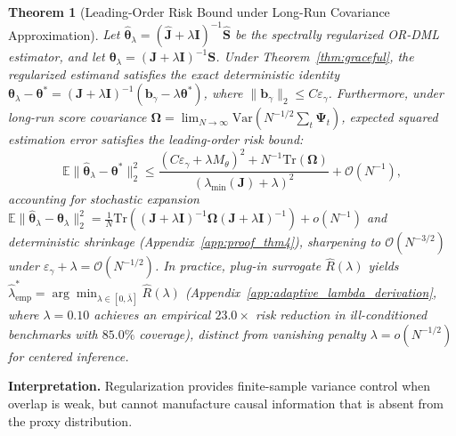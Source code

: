 \documentclass[twoside]{article}
\newtheorem{theorem}{Theorem}
\theoremstyle{definition}
\newcommand{\E}{\mathbb{E}}
\newcommand{\Var}{\mathrm{Var}}
\begin{document}
\begin{theorem}[Leading-Order Risk Bound under Long-Run Covariance Approximation]
\label{thm:spectral}
Let $\hat{\boldsymbol{\theta}}_\lambda = (\hat{\boldsymbol{J}} + \lambda \boldsymbol{I})^{-1}\hat{\boldsymbol{S}}$ be the spectrally regularized OR-DML estimator, and let $\boldsymbol{\theta}_\lambda = (\boldsymbol{J} + \lambda \boldsymbol{I})^{-1}\boldsymbol{S}$. Under Theorem~\ref{thm:graceful}, the regularized estimand satisfies the exact deterministic identity $\boldsymbol{\theta}_\lambda - \boldsymbol{\theta}^* = (\boldsymbol{J} + \lambda \boldsymbol{I})^{-1} \left( \boldsymbol{b}_\gamma - \lambda \boldsymbol{\theta}^* \right)$, where $\|\boldsymbol{b}_\gamma\|_2 \le C \varepsilon_\gamma$. Furthermore, under long-run score covariance $\boldsymbol{\Omega} = \lim_{N \to \infty} \Var(N^{-1/2}\sum_t \boldsymbol{\Psi}_t)$, expected squared estimation error satisfies the leading-order risk bound:
\begin{equation}
    \E\|\hat{\boldsymbol{\theta}}_\lambda - \boldsymbol{\theta}^*\|_2^2 \le \frac{(C \varepsilon_\gamma + \lambda M_\theta)^2 + N^{-1}\mathrm{Tr}(\boldsymbol{\Omega})}{(\lambda_{\min}(\boldsymbol{J}) + \lambda)^2} + \mathcal{O}(N^{-1}),
\end{equation}
accounting for stochastic expansion $\E\|\hat{\boldsymbol{\theta}}_\lambda - \boldsymbol{\theta}_\lambda\|_2^2 = \frac{1}{N}\mathrm{Tr}((\boldsymbol{J}+\lambda\boldsymbol{I})^{-1}\boldsymbol{\Omega}(\boldsymbol{J}+\lambda\boldsymbol{I})^{-1}) + o(N^{-1})$ and deterministic shrinkage (Appendix~\ref{app:proof_thm4}), sharpening to $\mathcal{O}(N^{-3/2})$ under $\varepsilon_\gamma + \lambda = \mathcal{O}(N^{-1/2})$. In practice, plug-in surrogate $\hat{R}(\lambda)$ yields $\hat{\lambda}^*_{\mathrm{emp}} = \arg\min_{\lambda \in [0, \bar{\lambda}]} \hat{R}(\lambda)$ (Appendix~\ref{app:adaptive_lambda_derivation}, where $\lambda = 0.10$ achieves an empirical $23.0\times$ risk reduction in ill-conditioned benchmarks with $85.0\%$ coverage), distinct from vanishing penalty $\lambda = o(N^{-1/2})$ for centered inference.
\end{theorem}
\textbf{Interpretation.} Regularization provides finite-sample variance control when overlap is weak, but cannot manufacture causal information that is absent from the proxy distribution.
\end{document}
